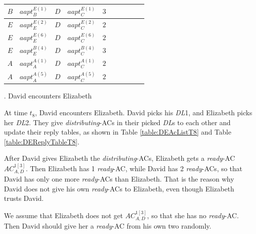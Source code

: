 \begin{table} [H]
\begin{tabu}{|c|c|c|c|c|c|c|c|c|c|}
$B$ & ${aapt}_{B}^{E\left(1\right)}$ & $D$ & ${aapt}_{C}^{E\left(1\right)}$ & $3$ &  &  &  &  &  \\ \hline
$E$ & ${aapt}_{E}^{E\left(2\right)}$ & $D$ & ${aapt}_{C}^{E\left(2\right)}$ & $2$ &  &  &  &  &  \\ \hline
$E$ & ${aapt}_{E}^{E\left(6\right)}$ & $D$ & ${aapt}_{C}^{E\left(6\right)}$ & $2$ &  &  &  &  &  \\ \hline
$E$ & ${aapt}_{E}^{B\left(4\right)}$ & $D$ & ${aapt}_{C}^{B\left(4\right)}$ & $3$ &  &  &  &  &  \\ \hline
$A$ & ${aapt}_{A}^{A\left(1\right)}$ & $D$ & ${aapt}_{C}^{A\left(1\right)}$ & $2$ &  &  &  &  &  \\ \hline
$A$ & ${aapt}_{A}^{A\left(5\right)}$ & $D$ & ${aapt}_{C}^{A\left(5\right)}$ & $2$ &  &  &  &  &  \\ \hline
\end{tabu}
\end{table}


.  David encounters Elizabeth

At time ${t}_{8}$, David encounters Elizabeth. David picks his \textit{DL}1, and Elizabeth picks her \textit{DL}2. They give \textit{distributing}-ACs in their picked \textit{DL}s to each other and update their reply tables, as shown in Table \ref{table:DEAcListT8} and Table \ref{table:DEReplyTableT8}.

After David gives Elizabeth the \textit{distributing}-ACs, Elizabeth gets a \textit{ready}-AC ${AC}^{1\left[3\right]}_{A,D}$. Then Elizabeth has 1 \textit{ready}-AC, while David has 2 \textit{ready}-ACs, so that David has only one more \textit{ready}-ACs than Elizabeth. That is the reason why David does not give his own \textit{ready}-ACs to Elizabeth, even though Elizabeth trusts David. 

We assume that Elizabeth does not get ${AC}^{1\left[3\right]}_{A,D}$, so that she has no \textit{ready}-AC. Then David should give her a \textit{ready}-AC from his own two randomly.

